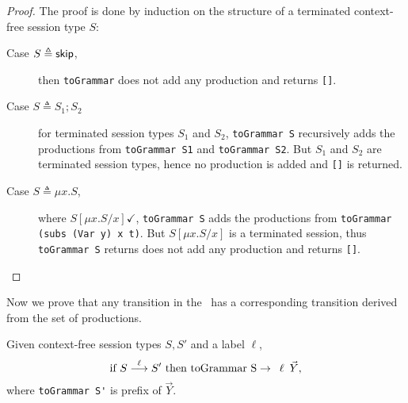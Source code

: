 \begin{proof}
	The proof is done by induction on the structure of a terminated
	context-free session type $S$:
	\begin{description}
		\item[Case $S\triangleq \mathsf{skip}$,] then \lstinline{toGrammar} does not
		add any production and returns \lstinline{[]}.
		\item[Case $S\triangleq S_1;S_2$] for terminated session types $S_1$ and
		$S_2$, \lstinline{toGrammar S} recursively adds the productions from
		\lstinline{toGrammar S1} and \lstinline{toGrammar S2}. But $S_1$ and
		$S_2$ are terminated session types, hence no production is added and
		\lstinline{[]} is returned.
		\item[Case $S\triangleq \mu x. S$,] where $S[\mu x.S/x] \checkmark$,
		\lstinline{toGrammar S} adds the productions from \linebreak
		\lstinline{toGrammar (subs (Var y) x t)}. But $S[\mu x.S/x]$ is a terminated
		session, thus \lstinline{toGrammar S} returns does not add
		any production and returns \lstinline{[]}.
	\end{description}
\end{proof}

Now we prove that any transition in the \LTS\ has a
corresponding transition derived from the set of productions.

\begin{lemma}
Given context-free session types $S,S'$ and a label $\ell$,
	\[ \text{if } S \LTSderives[\ell] S' \text{ then }
	\text{\lstinline{toGrammar S}} \rightarrow \enspace
	\ell \enspace \vec Y, \]
	where \lstinline{toGrammar S'} is prefix of $\vec Y$.
\end{lemma}

